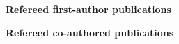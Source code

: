\documentclass[onecolumn,a4paper,12pt]{article}
\begin{document}
\thispagestyle{empty}
\pagestyle{empty}

\begin{center}
{\large\bf Refereed first-author publications}
\end{center}



\begin{center}
{\large\bf Refereed co-authored publications} 
\end{center}


\end{document}
